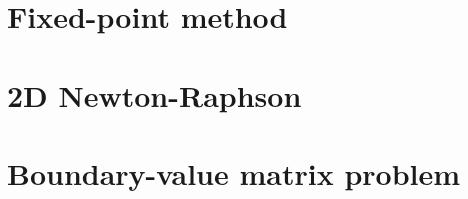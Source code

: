 \documentclass[../main.tex]{subfiles}
\begin{document}
    \chapter{Fixed-point method}\label{ch:fixed-point-method}
    

    \chapter{2D Newton-Raphson}\label{ch:2d-newton-raphson}
    

    \chapter{Boundary-value matrix problem}\label{ch:boundary-value-matrix-problem}
    
\end{document}
